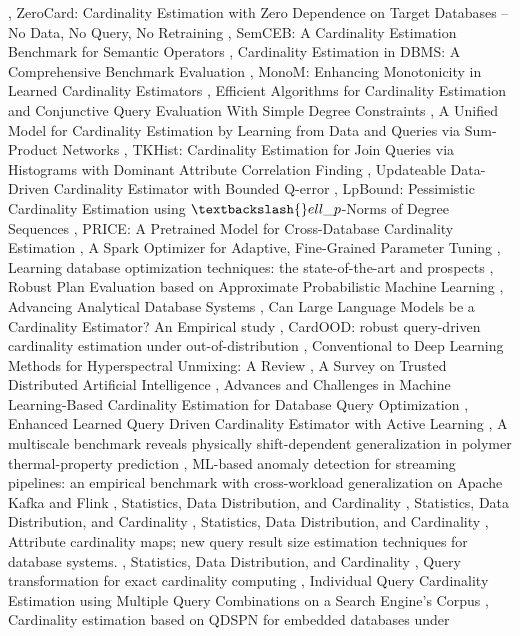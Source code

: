 \documentclass{article}
\begin{document}
\cite{lan2026learntf016e9cb}, ZeroCard: Cardinality Estimation with Zero Dependence on Target Databases -- No Data, No Query, No Retraining \cite{xu2025zerocard6688af97}, SemCEB: A Cardinality Estimation Benchmark for Semantic Operators \cite{zimmerer2026semcebdb6e1283}, Cardinality Estimation in DBMS: A Comprehensive Benchmark Evaluation \cite{han2021cardinality54766eab}, MonoM: Enhancing Monotonicity in Learned Cardinality Estimators \cite{yi2025monomafdcf650}, Efficient Algorithms for Cardinality Estimation and Conjunctive Query Evaluation With Simple Degree Constraints \cite{im2025efficient85e05562}, A Unified Model for Cardinality Estimation by Learning from Data and Queries via Sum-Product Networks \cite{liu2025unified433d0297}, TKHist: Cardinality Estimation for Join Queries via Histograms with Dominant Attribute Correlation Finding \cite{li2025tkhist1831fd4a}, Updateable Data-Driven Cardinality Estimator with Bounded Q-error \cite{li2024updateable64e45ae2}, LpBound: Pessimistic Cardinality Estimation using $\textbackslash{}ell\_p$-Norms of Degree Sequences \cite{zhang2025lpbound276c2ed2}, PRICE: A Pretrained Model for Cross-Database Cardinality Estimation \cite{zeng2024price1c0bf91c}, A Spark Optimizer for Adaptive, Fine-Grained Parameter Tuning \cite{lyu2024spark020f756c}, Learning database optimization techniques: the state-of-the-art and prospects \cite{qiao2025learning425294ce}, Robust Plan Evaluation based on Approximate Probabilistic Machine Learning \cite{kamali2024robustec68c61f}, Advancing Analytical Database Systems \cite{kipf2020advancing01988612}, Can Large Language Models be a Cardinality Estimator? An Empirical study \cite{liu2026can22fdddbc}, CardOOD: robust query-driven cardinality estimation under out-of-distribution \cite{li2026cardood911937cf}, Conventional to Deep Learning Methods for Hyperspectral Unmixing: A Review \cite{zou2025conventional04297a40}, A Survey on Trusted Distributed Artificial Intelligence \cite{aca2022survey611ddb57}, Advances and Challenges in Machine Learning-Based Cardinality Estimation for Database Query Optimization \cite{guan2025advancesaebc78e1}, Enhanced Learned Query Driven Cardinality Estimator with Active Learning \cite{tang2023enhanced35e74b47}, A multiscale benchmark reveals physically shift-dependent generalization in polymer thermal-property prediction \cite{yang2026multiscaleedfa6497}, ML-based anomaly detection for streaming pipelines: an empirical benchmark with cross-workload generalization on Apache Kafka and Flink \cite{anjum2026mlbasedbea5d1fe}, Statistics, Data Distribution, and Cardinality \cite{fritchey2018statistics7d93eb9e}, Statistics, Data Distribution, and Cardinality \cite{fritchey2026statistics80bc32a2}, Statistics, Data Distribution, and Cardinality \cite{fritchey2022statistics771db6c8}, Attribute cardinality maps; new query result size estimation techniques for database systems. \cite{thiyagarajahndattributea356c9f2}, Statistics, Data Distribution, and Cardinality \cite{fritchey2014statistics4751811f}, Query transformation for exact cardinality computing \cite{kwanglat2011querye61e117d}, Individual Query Cardinality Estimation using Multiple Query Combinations on a Search Engine's Corpus \cite{islam2017individualda079959}, Cardinality estimation based on QDSPN for embedded databases under 
\end{document}
